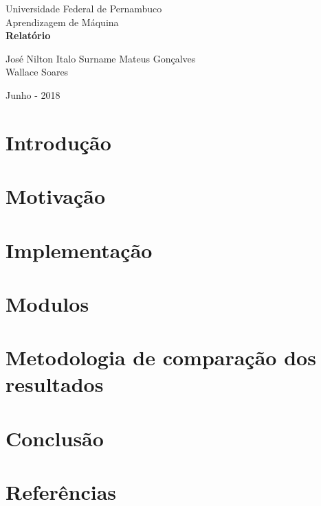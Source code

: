\documentclass[a4paper, 12pt]{article}
\begin{document}
    \sloppy
    \begin{titlepage}
        \begin{center}
            \Huge{Universidade Federal de Pernambuco}\\
            \large{Aprendizagem de Máquina}\\ 
            \vspace{15pt}
            \vspace{95pt}
            \textbf{\LARGE{Relatório}}\\
            \vspace{3,5cm}
        \end{center}
        
        \begin{flushleft}
            \begin{tabbing}
                José Nilton
                Italo Surname
                Mateus Gonçalves\\ 
                Wallace Soares\\
        \end{tabbing}
     \end{flushleft}
        \vspace{1cm}
        
        \begin{center}
            \vspace{\fill}
                 Junho - 2018\\
            
                \end{center}
    \end{titlepage}
    \newpage
    \tableofcontents
    \thispagestyle{empty}
    \newpage
    \section{Introdução}
    \newpage
    \section{Motivação}
    \section{Implementação}
    \section{Modulos}
    \section{Metodologia de comparação dos resultados}
    \section{Conclusão}
    \section{Referências}
    \begin{enumerate}
    \end{enumerate}
    
\end{document}
